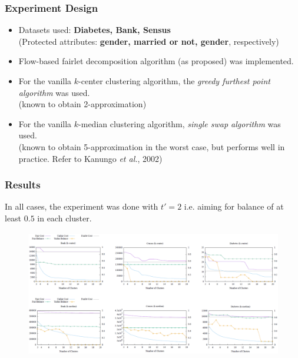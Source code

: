 \documentclass{beamer}
\begin{document}


\begin{frame}
\frametitle{Experiment Design}

\begin{itemize}
	\item Datasets used: {\bf Diabetes, Bank, Sensus}\\
	(Protected attributes: {\bf gender, married or not, gender}, respectively) \pause
	
	\item Flow-based fairlet decomposition algorithm (as proposed) was implemented. \pause
	
	\item For the vanilla $k$-center clustering algorithm, the {\it greedy furthest point algorithm} was used.\\
	{\small (known to obtain 2-approximation)} \pause
	
	\item For the vanilla $k$-median clustering algorithm, {\it single swap algorithm} was used.\\
	{\small (known to obtain 5-approximation in the worst case, but performs well in practice. Refer to Kanungo {\it et al.}, 2002)}

\end{itemize}

\end{frame}



\begin{frame}
\frametitle{Results}

In all cases, the experiment was done with $t' = 2$ i.e. aiming for balance of at least $0.5$ in each cluster.

\begin{figure}[hbt]
  \includegraphics[height=5.5cm]{fig4.png}
\end{figure}

\end{frame}
\end{document}

